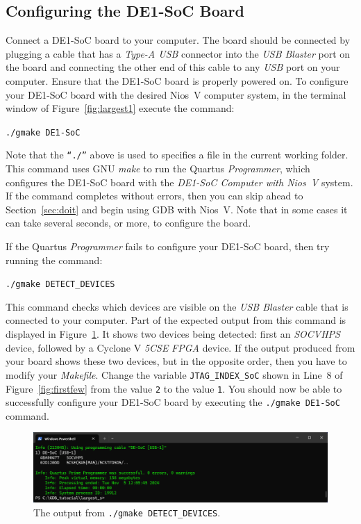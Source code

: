 \documentclass[11pt, twoside, pdftex]{article}
\begin{document}
\subsection{Configuring the DE1-SoC Board}

Connect a DE1-SoC board to your computer. The board should be connected by plugging
a cable that has a {\it Type-A USB} connector into the {\it USB Blaster} port on the board 
and connecting the other end of this cable to any {\it USB} port on your computer. Ensure 
that the DE1-SoC board is properly powered on.
To configure your DE1-SoC board with the desired Nios~V computer system, in the terminal
window of Figure~\ref{fig:largest1} execute the command:

\texttt{./gmake DE1-SoC} 

Note that the \texttt{``./''} above is used to specifies a file in the current working folder.
This command uses GNU {\it make} to run the Quartus {\it Programmer}, which configures the
DE1-SoC board with the {\it DE1-SoC Computer with Nios~V} system. If the command completes 
without errors, then you can skip ahead to Section~\ref{sec:doit} and begin using GDB 
with Nios~V. Note that in some cases it can take several seconds, or more, to configure the board. 

If the Quartus {\it Programmer} fails to configure your DE1-SoC board, then try running 
the command:

\texttt{./gmake DETECT\_DEVICES}

This command checks which devices are visible on the {\it USB Blaster} cable that is connected to
your computer. Part of the expected output from this command is displayed in
Figure~\ref{fig:detect}. It shows 
two devices being detected: first an {\it SOCVHPS} device, followed by a Cyclone V {\it 5CSE} 
{\it FPGA} device.  If the output produced from your board shows these two devices, but in the 
opposite order, then you have to modify your {\it Makefile}.
Change the variable \texttt{JTAG\_INDEX\_SoC} shown in Line~8 of 
Figure~\ref{fig:firstfew} from the value \texttt{2} to the value \texttt{1}. You should now 
be able to successfully configure your DE1-SoC board by executing the \texttt{./gmake DE1-SoC}
command. 

\begin{figure}[h]
    \begin{center}
        \includegraphics[scale=.55]{figures/detect.png}
        \caption{The output from \texttt{./gmake DETECT\_DEVICES}.}
        \label{fig:detect}
    \end{center}
\end{figure}
\end{document}
